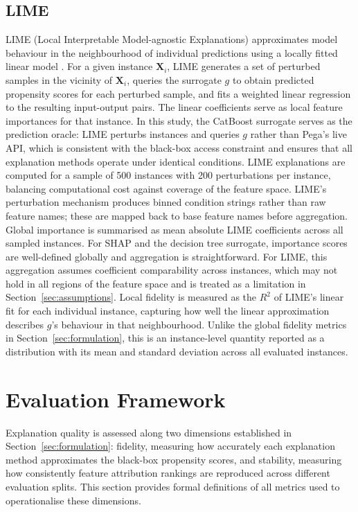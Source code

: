 \documentclass[oneside]{memoir} %
\begin{document}
\subsection{LIME}

LIME (Local Interpretable Model-agnostic Explanations) approximates model behaviour in the neighbourhood of individual predictions using a locally fitted linear model \parencite{ribeiro_why_2016}. For a given instance $\mathbf{X}_i$, LIME generates a set of perturbed samples in the vicinity of $\mathbf{X}_i$, queries the surrogate $g$ to obtain predicted propensity scores for each perturbed sample, and fits a weighted linear regression to the resulting input-output pairs. The linear coefficients serve as local feature importances for that instance. In this study, the CatBoost surrogate serves as the prediction oracle: LIME perturbs instances and queries $g$ rather than Pega's live API, which is consistent with the black-box access constraint and ensures that all explanation methods operate under identical conditions. LIME explanations are computed for a sample of 500 instances with 200 perturbations per instance, balancing computational cost against coverage of the feature space. LIME's perturbation mechanism produces binned condition strings rather than raw feature names; these are mapped back to base feature names before aggregation. Global importance is summarised as mean absolute LIME coefficients across all sampled instances. For SHAP and the decision tree surrogate, importance scores are well-defined globally and aggregation is straightforward. For LIME, this aggregation assumes coefficient comparability across instances, which may not hold in all regions of the feature space and is treated as a limitation in Section~\ref{sec:assumptions}. Local fidelity is measured as the $R^2$ of LIME's linear fit for each individual instance, capturing how well the linear approximation describes $g$'s behaviour in that neighbourhood. Unlike the global fidelity metrics in Section~\ref{sec:formulation}, this is an instance-level quantity reported as a distribution with its mean and standard deviation across all evaluated instances.

\section{Evaluation Framework} \label{sec:evaluation}

Explanation quality is assessed along two dimensions established in Section~\ref{sec:formulation}: fidelity, measuring how accurately each explanation method approximates the black-box propensity scores, and stability, measuring how consistently feature attribution rankings are reproduced across different evaluation splits. This section provides formal definitions of all metrics used to operationalise these dimensions.
\end{document}
